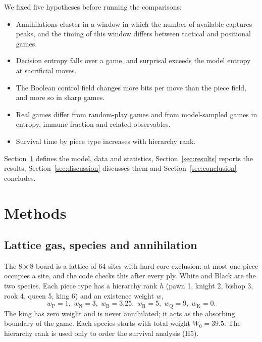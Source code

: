 \documentclass[11pt,a4paper]{article}
\begin{document}
We fixed five hypotheses before running the comparisons:
\begin{itemize}\setlength\itemsep{0pt}
\item[\textbf{H1}] Annihilations cluster in a window in which the number of available captures peaks, and the timing of this window differs between tactical and positional games.
\item[\textbf{H2}] Decision entropy falls over a game, and surprisal exceeds the model entropy at sacrificial moves.
\item[\textbf{H3}] The Boolean control field changes more bits per move than the piece field, and more so in sharp games.
\item[\textbf{H4}] Real games differ from random-play games and from model-sampled games in entropy, immune fraction and related observables.
\item[\textbf{H5}] Survival time by piece type increases with hierarchy rank.
\end{itemize}
Section~\ref{sec:methods} defines the model, data and statistics, Section~\ref{sec:results} reports the results, Section~\ref{sec:discussion} discusses them and Section~\ref{sec:conclusion} concludes.

\section{Methods}\label{sec:methods}

\subsection{Lattice gas, species and annihilation}
The $8\times8$ board is a lattice of 64 sites with hard-core exclusion: at most one piece occupies a site, and the code checks this after every ply. White and Black are the two species. Each piece type has a hierarchy rank $h$ (pawn 1, knight 2, bishop 3, rook 4, queen 5, king 6) and an existence weight $w$,
\begin{equation}
w_{\mathrm{P}}=1,\; w_{\mathrm{N}}=3,\; w_{\mathrm{B}}=3.25,\; w_{\mathrm{R}}=5,\; w_{\mathrm{Q}}=9,\; w_{\mathrm{K}}=0 .
\end{equation}
The king has zero weight and is never annihilated; it acts as the absorbing boundary of the game. Each species starts with total weight $W_0=39.5$. The hierarchy rank is used only to order the survival analysis (H5).
\end{document}
